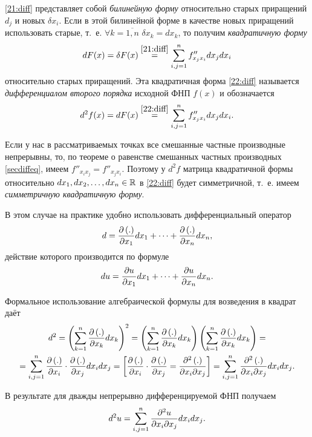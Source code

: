 \documentclass[../../main.tex]{subfiles}
\begin{document}
	\eqref{21:diff} представляет собой \emph{билинейную форму} относительно 
	старых приращений $d_j$ и новых $\delta x_i$. Если в этой билинейной форме 
	в качестве новых приращений использовать старые, т.~е. 
	$\forall k = \overline{1, n}$ $\delta x_k = dx_k$, то получим 
	\emph{квадратичную форму}
	\begin{equation}
		dF(x) = \delta F(x) \overset{\eqref{21:diff}}{=} 
		\sum_{i, j = 1}^nf''_{x_jx_i}dx_jdx_i
		\label{22:diff}
	\end{equation}
	относительно старых приращений. Эта квадратичная форма \eqref{22:diff} 
	называется \emph{дифференциалом второго порядка} исходной ФНП $f(x)$ 
	и обозначается
	\[d^2f(x) = dF(x) \overset{\eqref{22:diff}}{=} 
	\sum_{i, j = 1}^nf''_{x_jx_i}dx_jdx_i.\]
		
	Если у нас в рассматриваемых точках все смешанные частные производные 
	непрерывны, то, по теореме о равенстве смешанных частных производных 
	\eqref{secdiffeq}, имеем $f''_{x_ix_j} = f''_{x_jx_i}$. Поэтому у $d^2f$ 
	матрица квадратичной формы относительно $dx_1, dx_2,\dots, dx_n\in\mathbb{R}$ в 
	\eqref{22:diff} будет симметричной, т.~е. имеем 
	\emph{симметричную квадратичную форму}.
	
	В этом случае на практике удобно использовать дифференциальный оператор
	\begin{equation}
		d = \frac{\partial \left(.\right)}{\partial x_1}dx_1 + \dots + 
		\frac{\partial \left(.\right)}{\partial x_n}dx_n,
		\label{23:diff}
	\end{equation}
	действие которого производится по формуле
	\[du = \frac{\partial u}{\partial x_1}dx_1 + \dots + \frac{\partial u}{\partial x_n}dx_n.\]
	
	Формальное использование алгебраической формулы для возведения в квадрат 
	даёт
	\begin{gather*}
		d^2 = \left(\sum_{k = 1}^n\frac{\partial \left(.\right)}{\partial x_k}dx_k\right)^2 = 
		\left(\sum_{k = 1}^n\frac{\partial \left(.\right)}{\partial x_k}dx_k\right)
		\left(\sum_{k = 1}^n\frac{\partial \left(.\right)}{\partial x_k}dx_k\right) = \\
		= \sum_{i, j = 1}^n\frac{\partial \left(.\right)}{\partial x_i}\cdot
		\frac{\partial \left(.\right)}{\partial x_j}dx_idx_j = \left[\begin{aligned}
			\frac{\partial \left(.\right)}{\partial x_i}\cdot\frac{\partial \left(.\right)}{\partial x_j} = 
			\frac{\partial ^2\left(.\right)}{\partial x_i\partial x_j}
		\end{aligned}\right] = 
		\sum_{i, j = 1}^n\frac{\partial ^2\left(.\right)}{\partial x_i\partial x_j}dx_idx_j.
	\end{gather*}
	
	В результате для дважды непрерывно дифференцируемой ФНП получаем
	\[d^2u = \sum_{i, j = 1}^n\frac{\partial ^2u}{\partial x_i\partial x_j}dx_idx_j.\]
	
\end{document}
